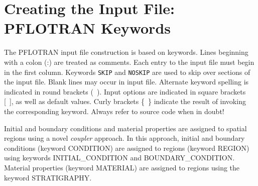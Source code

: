 \documentclass[12pt]{article}
\begin{document}

\newpage

\section{Creating the Input File: PFLOTRAN Keywords}

The PFLOTRAN input file construction is based on keywords. Lines beginning with a colon (:) are treated as comments. Each entry to the input file must begin in the first column. Keywords {\tt SKIP} and {\tt NOSKIP} are used to skip over sections of the input file. Blank lines may occur in input file. Alternate keyword spelling is indicated in round brackets (~). Input options are indicated in square brackets [~], as well as default values. Curly brackets \{~\} indicate the result of invoking the corresponding keyword. Always refer to source code when in doubt!

Initial and boundary conditions and material properties are assigned to spatial regions using a novel {\em coupler} approach. In this approach, initial and boundary conditions (keyword CONDITION) are assigned to regions (keyword REGION) using keywords INITIAL\_CONDITION and BOUNDARY\_CONDITION. Material properties (keyword MATERIAL) are assigned to regions using the keyword STRATIGRAPHY.
\end{document}
